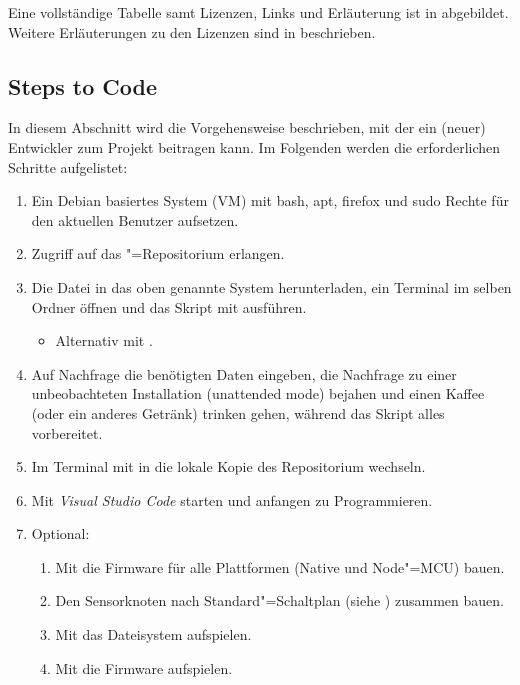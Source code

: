 Eine vollständige Tabelle samt Lizenzen, Links und Erläuterung ist in  abgebildet.
Weitere Erläuterungen zu den Lizenzen sind in  beschrieben.

\subsection{Steps to Code}
\label{sec:sk:stepsToCode}
In diesem Abschnitt wird die Vorgehensweise beschrieben, mit der ein (neuer) Entwickler zum Projekt beitragen kann.
Im Folgenden werden die erforderlichen Schritte aufgelistet:

\begin{enumerate}
	\item{Ein Debian basiertes System (VM) mit bash, apt, firefox und sudo Rechte für den aktuellen Benutzer aufsetzen.}
	\item{Zugriff auf das "=Repositorium erlangen.}
	\item{Die Datei  in das oben genannte System herunterladen, ein Terminal im selben Ordner öffnen und das Skript mit  ausführen.}
	\begin{itemize}
		\item{Alternativ mit .}
	\end{itemize}
	\item{Auf Nachfrage die benötigten Daten eingeben, die Nachfrage zu einer unbeobachteten Installation (unattended mode) bejahen und einen Kaffee (oder ein anderes Getränk) trinken gehen, während das Skript alles vorbereitet.}
	\item{Im Terminal mit  in die lokale Kopie des Repositorium wechseln.}
	\item{Mit  \textit{Visual Studio Code} starten und anfangen zu Programmieren.}
	\item{Optional:}
	\begin{enumerate}
		\item{Mit  die Firmware für alle Plattformen (Native und Node"=MCU) bauen.}
		\item{Den Sensorknoten nach Standard"=Schaltplan (siehe ) zusammen bauen.}
		\item{Mit  das Dateisystem aufspielen.}
		\item{Mit  die Firmware aufspielen.}
	\end{enumerate}
\end{enumerate}

